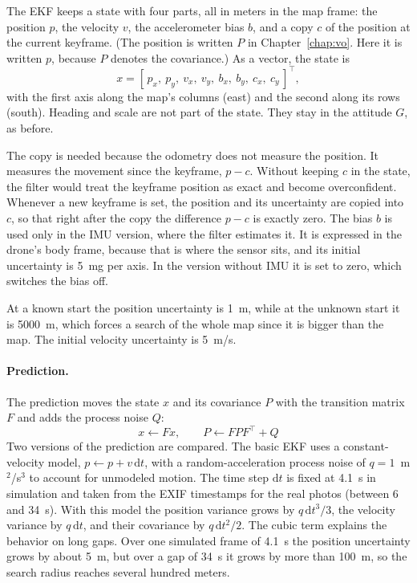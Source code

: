 \documentclass[english, Lau, oneside]{sapthesis}%
\begin{document}
The EKF keeps a state with four parts, all in meters in the map frame: the position $p$, the velocity $v$, the accelerometer bias $b$, and a copy $c$ of the position at the current keyframe. (The position is written $P$ in Chapter~\ref{chap:vo}. Here it is written $p$, because $P$ denotes the covariance.) As a vector, the state is
\begin{equation}
  x = [\,p_x,\ p_y,\ v_x,\ v_y,\ b_x,\ b_y,\ c_x,\ c_y\,]^{\top},
  \label{eq:ekf-state}
\end{equation}
with the first axis along the map's columns (east) and the second along its rows (south). Heading and scale are not part of the state. They stay in the attitude $G$, as before.

The copy is needed because the odometry does not measure the position. It measures the movement since the keyframe, $p - c$. Without keeping $c$ in the state, the filter would treat the keyframe position as exact and become overconfident. Whenever a new keyframe is set, the position and its uncertainty are copied into $c$, so that right after the copy the difference $p - c$ is exactly zero. The bias $b$ is used only in the IMU version, where the filter estimates it. It is expressed in the drone's body frame, because that is where the sensor sits, and its initial uncertainty is 5~mg per axis. In the version without IMU it is set to zero, which switches the bias off.

At a known start the position uncertainty is 1~m, while at the unknown start it is 5000~m, which forces a search of the whole map since it is bigger than the map. The initial velocity uncertainty is 5~m/s.

\paragraph{Prediction.}
The prediction moves the state $x$ and its covariance $P$ with the transition matrix $F$ and adds the process noise $Q$:
\begin{equation}
  x \leftarrow F x, \qquad P \leftarrow F P F^{\top} + Q
  \label{eq:ekf-predict}
\end{equation}
Two versions of the prediction are compared. The basic EKF uses a constant-velocity model, $p \leftarrow p + v\,\mathrm{d}t$, with a random-acceleration process noise of $q = 1$~m$^2$/s$^3$ to account for unmodeled motion. The time step $\mathrm{d}t$ is fixed at 4.1~s in simulation and taken from the EXIF timestamps for the real photos (between 6 and 34~s). With this model the position variance grows by $q\,\mathrm{d}t^3/3$, the velocity variance by $q\,\mathrm{d}t$, and their covariance by $q\,\mathrm{d}t^2/2$. The cubic term explains the behavior on long gaps. Over one simulated frame of 4.1~s the position uncertainty grows by about 5~m, but over a gap of 34~s it grows by more than 100~m, so the search radius reaches several hundred meters.
\end{document}
